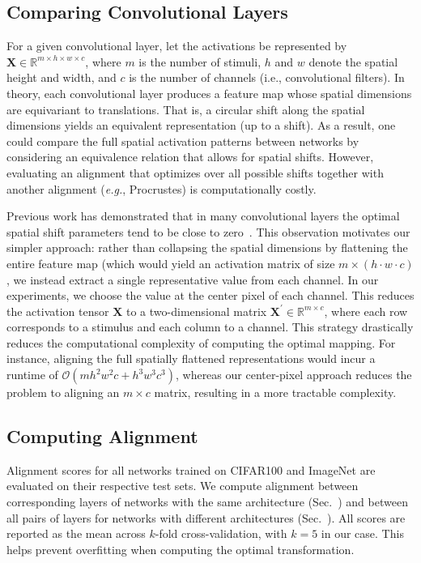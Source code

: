 \documentclass[10pt,letterpaper]{article}
\begin{document}
\subsection{Comparing Convolutional Layers}
For a given convolutional layer, let the activations be represented by $\bm{X} \in \mathbb{R}^{m \times h \times w \times c}$, where \(m\) is the number of stimuli, \(h\) and \(w\) denote the spatial height and width, and \(c\) is the number of channels (i.e., convolutional filters). In theory, each convolutional layer produces a feature map whose spatial dimensions are equivariant to translations. That is, a circular shift along the spatial dimensions yields an equivalent representation (up to a shift). As a result, one could compare the full spatial activation patterns between networks by considering an equivalence relation that allows for spatial shifts. However, evaluating an alignment that optimizes over all possible shifts together with another alignment (\emph{e.g.}, Procrustes) is computationally costly.

Previous work has demonstrated that in many convolutional layers the optimal spatial shift parameters tend to be close to zero~\citep{williams2021generalized}. This observation motivates our simpler approach: rather than collapsing the spatial dimensions by flattening the entire feature map (which would yield an activation matrix of size \(m \times (h \cdot w \cdot c)\), we instead extract a single representative value from each channel. In our experiments, we choose the value at the center pixel of each channel. This reduces the activation tensor \(\bm{X}\) to a two-dimensional matrix $\bm{X}^{\prime} \in \mathbb{R}^{m \times c}$,
where each row corresponds to a stimulus and each column to a channel. This strategy drastically reduces the computational complexity of computing the optimal mapping. For instance, aligning the full spatially flattened representations would incur a runtime of \(\mathcal{O}(m h^2w^2c + h^3w^3c^3)\), whereas our center-pixel approach reduces the problem to aligning an \(m \times c\) matrix, resulting in a more tractable complexity.



\subsection{Computing Alignment}
Alignment scores for all networks trained on CIFAR100 and ImageNet are evaluated on their respective test sets. We compute alignment between corresponding layers of networks with the same architecture (Sec.~) and between all pairs of layers for networks with different architectures (Sec.~). All scores are reported as the mean across $k$-fold cross-validation, with $k = 5$ in our case. This helps prevent overfitting when computing the optimal transformation. 
\end{document}
